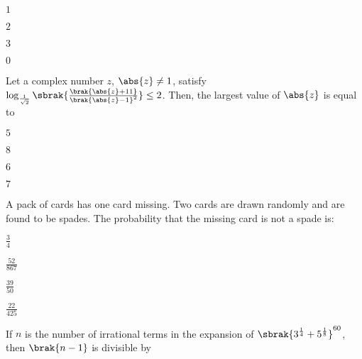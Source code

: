     \hfill{}
    
    \begin{enumerate}
    \begin{multicols}{4}
        \item $1$
        \item $2$
        \item $3$
        \item $0$
    \end{multicols}
    \end{enumerate}

    \item
    Let a complex number $z$, $\abs{z} \neq 1$, satisfy $\log_{\frac{1}{\sqrt{2}}} \sbrak{\frac{\brak{\abs{z} + 11}}{\brak{\abs{z} - 1}^2}} \leq 2$. Then, the largest value of $\abs{z}$ is equal to 

    \hfill{}
    
    \begin{enumerate}
    \begin{multicols}{4}
        \item $5$
        \item $8$
        \item $6$
        \item $7$
    \end{multicols}
    \end{enumerate}
    
    \item 
    A pack of cards has one card missing. Two cards are drawn randomly and are found to be spades. The probability that the missing card is not a spade is:
    
    \hfill{}
    
    \begin{enumerate}
    \begin{multicols}{4}
        \item $\frac{3}{4}$
        \item $\frac{52}{867}$
        \item $\frac{39}{50}$
        \item $\frac{22}{425}$
    \end{multicols}
    \end{enumerate}

    \item 
    If $n$ is the number of irrational terms in the expansion of $\sbrak{3^{\frac{1}{4}} + 5^{\frac{1}{8}}}^{60}$, then $\brak{n - 1}$ is divisible by

